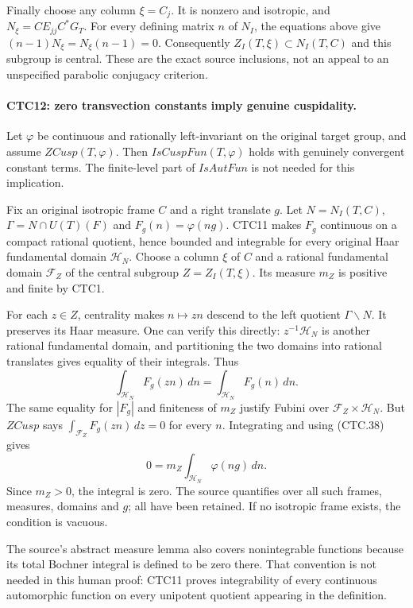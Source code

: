 Finally choose any column $\xi=C_j$.  It is nonzero and isotropic,
and
$N_\xi=C E_{jj}C^*G_T$.
For every defining matrix $n$ of $N_I$, the equations above give
$(n-1)N_\xi=N_\xi(n-1)=0$.
Consequently $Z_I(T,\xi)\subset N_I(T,C)$ and this subgroup is
central.  These are the exact source inclusions, not an appeal
to an unspecified parabolic conjugacy criterion.

\paragraph{CTC12: zero transvection constants imply genuine cuspidality.}
\label{claim:CTC12}
Let $\varphi$ be continuous and rationally left-invariant on the
original target group, and assume $ZCusp(T,\varphi)$.  Then
$IsCuspFun(T,\varphi)$ holds with genuinely convergent constant
terms.  The finite-level part of $IsAutFun$ is not needed for
this implication.

Fix an original isotropic frame $C$ and a right translate $g$.
Let $N=N_I(T,C)$, $\Gamma=N\cap U(T)(F)$ and
$F_g(n)=\varphi(ng)$.  CTC11 makes $F_g$ continuous on a compact
rational quotient, hence bounded and integrable for every
original Haar fundamental domain $\mathcal H_N$.  Choose a
column $\xi$ of $C$ and a rational fundamental domain
$\mathcal F_Z$ of the central subgroup $Z=Z_I(T,\xi)$.
Its measure $m_Z$ is positive and finite by CTC1.

For each $z\in Z$, centrality makes $n\mapsto zn$ descend to
the left quotient $\Gamma\backslash N$.  It preserves its
Haar measure.  One can verify this directly: $z^{-1}\mathcal H_N$
is another rational fundamental domain, and partitioning the two
domains into rational translates gives equality of their integrals.
Thus
\[
 \int_{\mathcal H_N}F_g(zn)\,dn
                   =\int_{\mathcal H_N}F_g(n)\,dn.
 \tag{CTC.38}
\]
The same equality for $|F_g|$ and finiteness of $m_Z$ justify
Fubini over $\mathcal F_Z\times\mathcal H_N$.  But $ZCusp$
says $\int_{\mathcal F_Z}F_g(zn)\,dz=0$ for every $n$.
Integrating and using (CTC.38) gives
\[
                 0=m_Z\int_{\mathcal H_N}\varphi(ng)\,dn.
 \tag{CTC.39}
\]
Since $m_Z>0$, the integral is zero.  The source quantifies
over all such frames, measures, domains and $g$; all have been
retained.  If no isotropic frame exists, the condition is vacuous.

The source's abstract measure lemma also covers nonintegrable
functions because its total Bochner integral is defined to be
zero there.  That convention is not needed in this human proof:
CTC11 proves integrability of every continuous automorphic
function on every unipotent quotient appearing in the definition.

